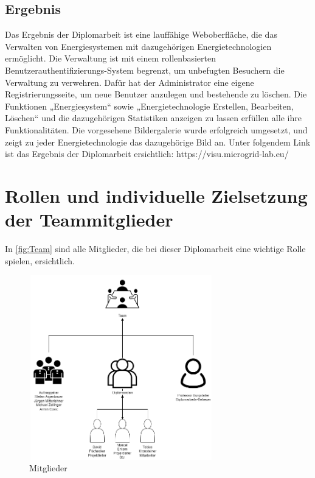\subsection{Ergebnis}
Das Ergebnis der Diplomarbeit ist eine lauffähige Weboberfläche, die das Verwalten von Energiesystemen mit dazugehörigen Energietechnologien ermöglicht. Die Verwaltung ist mit einem rollenbasierten \newline Benutzerauthentifizierungs-System begrenzt, um unbefugten Besuchern die Verwaltung zu verwehren. Dafür hat der Administrator eine eigene Registrierungsseite, um neue Benutzer anzulegen und bestehende zu löschen. Die Funktionen „Energiesystem“ sowie „Energietechnologie Erstellen, Bearbeiten, Löschen“ und die dazugehörigen Statistiken anzeigen zu lassen erfüllen alle ihre Funktionalitäten. Die vorgesehene Bildergalerie wurde erfolgreich umgesetzt, und zeigt zu jeder Energietechnologie das dazugehörige Bild an.
Unter folgendem Link ist das Ergebnis der Diplomarbeit ersichtlich:
https://visu.microgrid-lab.eu/


\newpage
\section{Rollen und individuelle Zielsetzung der Teammitglieder}
In \autoref{fig:Team} sind alle Mitglieder, die bei dieser Diplomarbeit eine wichtige Rolle spielen, ersichtlich.

\begin{figure}[h]
	\centering
	\includegraphics[height=8cm,width=8cm]{images/Team}
	\caption{Mitglieder}
	\label{fig:Team}
\end{figure}



